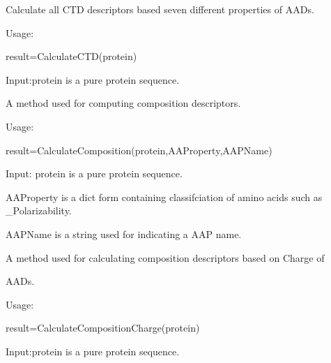 \documentclass[letterpaper,10pt,english]{sphinxmanual}
\begin{document}

\begin{fulllineitems}
\label{reference/CTD:CTD.CalculateCTD}
Calculate all CTD descriptors based seven different properties of AADs.

Usage:

result=CalculateCTD(protein)

Input:protein is a pure protein sequence.

\end{fulllineitems}


\begin{fulllineitems}
\label{reference/CTD:CTD.CalculateComposition}
A method used for computing composition descriptors.

Usage:

result=CalculateComposition(protein,AAProperty,AAPName)

Input: protein is a pure protein sequence.

AAProperty is a dict form containing classifciation of amino acids such as \_Polarizability.

AAPName is a string used for indicating a AAP name.

\end{fulllineitems}


\begin{fulllineitems}
\label{reference/CTD:CTD.CalculateCompositionCharge}
A method used for calculating composition descriptors based on Charge of

AADs.

Usage:

result=CalculateCompositionCharge(protein)

Input:protein is a pure protein sequence.

\end{fulllineitems}

\end{document}
